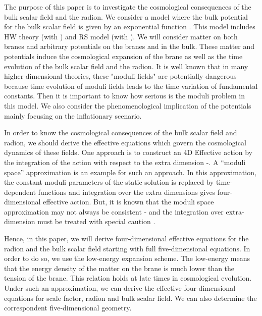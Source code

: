 \documentclass[a4paper,11pt]{article}
\begin{document}
The purpose of this paper is to investigate the cosmological consequences 
of the bulk scalar field and the radion. We consider a model where the 
bulk potential for the bulk scalar field \myHighlight{$\phi$}\coordHE{} is given by an exponential 
function \coordHE{}. This model includes  
HW theory (with \coordHE{}) and RS model (with \coordHE{}). We will consider matter on both 
branes and arbitrary potentials on the branes and in the bulk. These matter and 
potentials induce the cosmological expansion of the brane as well as the 
time evolution of the bulk scalar field and the radion. It is well known that 
in many higher-dimensional theories, these "moduli fields" are potentially
dangerous because time evolution of moduli fields leads to the time variation
of fundamental constants. Then it is important to know how serious is the 
moduli problem in this model. We also consider the phenomenological 
implication of the potentials mainly focusing on the inflationary scenario.

In order to know the cosmological consequences of the 
bulk scalar field and radion, we should derive the effective
equations which govern the cosmological dynamics of these  
fields. One approach is to construct an 
4D Effective action by the integration of the action with respect to 
the extra dimension \cite{chiba}-\cite{BBDR1}.  
A ``moduli space'' approximation is an example for such an approach.
In this approximation,  the constant moduli parameters 
of the static solution is replaced by time-dependent functions and integration 
over the extra dimensions gives four-dimensional effective action. 
But, it is known that the moduli space
approximation may not always be consistent \cite{KKLT}-\cite{T}
and the integration over extra-dimension must be treated with special caution 
\cite{Mukohyama}.

Hence, in this paper, we will derive four-dimensional effective 
equations for the radion and the bulk scalar field starting with full 
five-dimensional equations. In order to do so, we use the low-energy expansion 
scheme. The low-energy means that the energy density of the matter 
on the brane 
is much lower than the tension of the brane. This relation holds 
at late times in cosmological evolution. Under such an approximation, 
we can derive the effective four-dimensional equations for 
scale factor, radion and bulk scalar field. We can also determine
the correspondent five-dimensional geometry.
\end{document}
